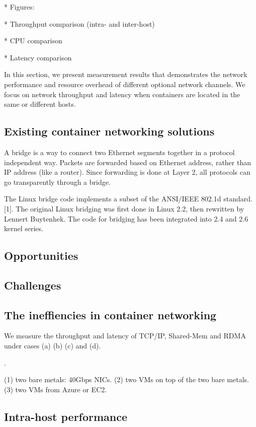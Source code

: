 * Figures:

* Throughput comparison (intra- and inter-host)

* CPU comparison

* Latency comparison

In this section, we present measurement results that demonstrates the network performance and resource overhead of different optional network channels. We focus on network throughput and latency when containers are located in the same or different hosts. 


\subsection{Existing container networking solutions}

A bridge is a way to connect two Ethernet segments together in a protocol independent way. Packets are forwarded based on Ethernet address, rather than IP address (like a router). Since forwarding is done at Layer 2, all protocols can go transparently through a bridge.

The Linux bridge code implements a subset of the ANSI/IEEE 802.1d standard. [1]. The original Linux bridging was first done in Linux 2.2, then rewritten by Lennert Buytenhek. The code for bridging has been integrated into 2.4 and 2.6 kernel series.


\subsection{Opportunities}

\subsection{Challenges}

\subsection{The ineffiencies in container networking}

We measure the throughput and latency of TCP/IP, Shared-Mem and RDMA under cases
(a) (b) (c) and (d).

.

(1) two bare metals: 40Gbps NICs.
(2) two VMs on top of the two bare metals.
(3) two VMs from Azure or EC2.

\subsection{Intra-host performance}
